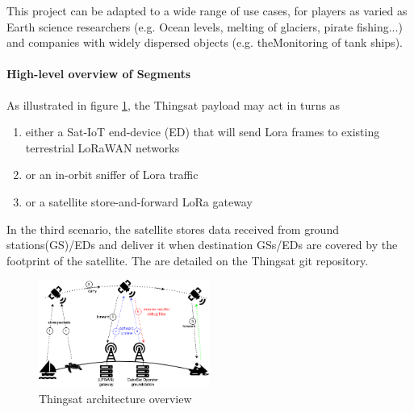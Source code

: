 
This project can be adapted to a wide range of use cases, for players as varied
as Earth science researchers (e.g. Ocean levels, melting of glaciers, pirate
fishing...) and companies with widely dispersed objects (e.g. theMonitoring of
tank ships). 


\paragraph*{High-level overview of Segments}

As illustrated in figure \ref{fig:archi}, the Thingsat payload may act in turns as 
\begin{enumerate}
    \item either a Sat-IoT end-device (ED) that will send Lora frames to existing terrestrial LoRaWAN networks
    \item or an in-orbit sniffer of Lora traffic
    \item or a satellite store-and-forward LoRa gateway
\end{enumerate}

In the third scenario, the satellite stores data received from ground
stations(GS)/EDs and deliver it when destination GSs/EDs are covered by the
footprint of the satellite. The %
are detailed on the Thingsat git repository. 


\begin{figure}[h]
    \centering
    \includegraphics[width=0.5\textwidth]{Figures/thingsat-dtn.png}
    \caption{Thingsat architecture overview}
    \label{fig:archi}
\end{figure}

